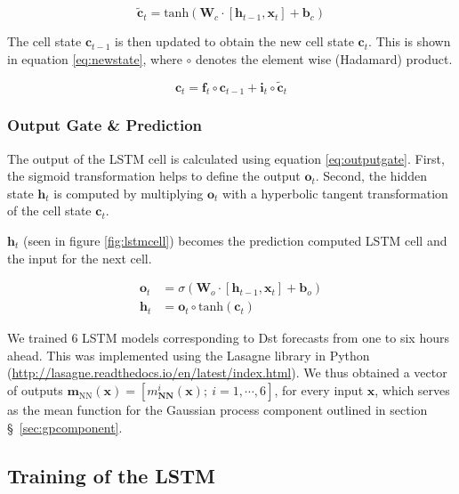 \begin{equation}\label{eq:candidate}
 \tilde{\mathbf{c}}_{t} = \text{tanh} \left( \mathbf{W}_{c} \cdot  \left[ \mathbf{h}_{t-1},\mathbf{x}_t \right] + 
 \mathbf{b}_{c} \right)
\end{equation}

The cell state  \( \mathbf{c}_{t-1} \) is then updated to obtain the new cell state \( \mathbf{c}_t \). This 
is shown in equation \ref{eq:newstate}, where $\circ$ denotes the element wise (Hadamard) product. 

\begin{equation}\label{eq:newstate}
 \mathbf{c}_t = \mathbf{f}_{t} \circ \mathbf{c}_{t-1} + \mathbf{i}_{t} \circ \tilde{\mathbf{c}}_{t}
\end{equation}

\subsubsection*{Output Gate \& Prediction}

The output of the LSTM cell is calculated using equation \ref{eq:outputgate}. First, the 
sigmoid transformation helps to define the output $\mathbf{o}_t$. Second, the hidden state $\mathbf{h}_t$ 
is computed by multiplying $\mathbf{o}_{t}$ with a hyperbolic tangent transformation of the cell state 
$\mathbf{c}_{t}$. 

$\mathbf{h}_{t}$ (seen in figure \ref{fig:lstmcell}) becomes the prediction computed LSTM cell and the input 
for the next cell.


\begin{align} \label{eq:outputgate}
	\mathbf{o}_{t} &= \sigma \left( 
		\mathbf{W}_o \cdot \left[\mathbf{h}_{t-1}, \mathbf{x}_{t} \right] + \mathbf{b}_o \right) \\
	\mathbf{h}_{t} &= \mathbf{o}_{t} \circ \text{tanh}(\mathbf{c}_t)
\end{align}

We trained 6 LSTM models corresponding to Dst forecasts from one to six hours ahead. This was implemented using the 
Lasagne library in Python (\url{http://lasagne.readthedocs.io/en/latest/index.html}). We thus obtained a 
vector of outputs \( \textbf{m}_{\text{NN}} \left( \mathbf{x} \right)  = [m^{i}_{\textbf{NN}}(\mathbf{x}); \ i = {1, \cdots, 6}] \), 
for every input \( \mathbf{x} \), which serves as the mean function for the Gaussian process component outlined 
in section \S~\ref{sec:gpcomponent}. 

\subsection{Training of the LSTM}


